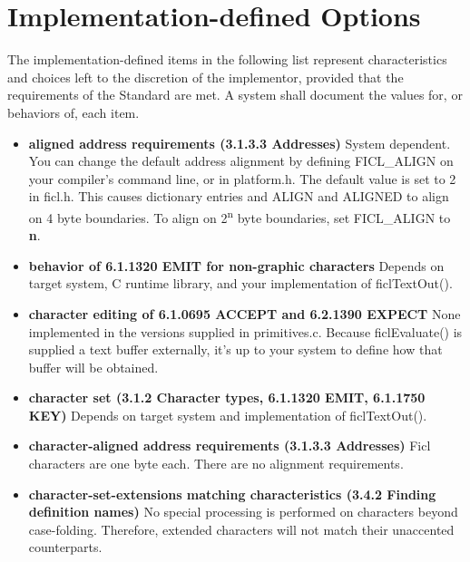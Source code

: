 \section{Implementation-defined Options}
The implementation-defined items in the following list represent
characteristics and choices left to the discretion of the implementor,
provided that the requirements of the Standard are met. A system shall
document the values for, or behaviors of, each item.
\begin{itemize}[noitemsep]
	\item \textbf{aligned address requirements (3.1.3.3
		Addresses)}\newline
	System dependent. You can change the default address alignment
	by defining FICL\_ALIGN on your compiler's command line, or in
	platform.h. The default value is set to 2 in ficl.h. This causes
	dictionary entries and ALIGN and ALIGNED to align on 4 byte
	boundaries. To align on 2\textsuperscript{n} byte boundaries,
	set FICL\_ALIGN to \textbf{n}.

	\item \textbf{behavior of 6.1.1320 EMIT for non-graphic
		characters}\newline
	Depends on target system, C runtime library, and your
	implementation of ficlTextOut().

	\item \textbf{character editing of 6.1.0695 ACCEPT and 6.2.1390
		EXPECT}\newline
	None implemented in the versions supplied in primitives.c.
	Because ficlEvaluate() is supplied a text buffer externally,
	it's up to your system to define how that buffer will be obtained.

	\item \textbf{character set (3.1.2 Character types, 6.1.1320
		EMIT, 6.1.1750 KEY)}\newline
	Depends on target system and implementation of ficlTextOut().

	\item \textbf{character-aligned address requirements (3.1.3.3
		Addresses)}\newline
	Ficl characters are one byte each. There are no alignment
	requirements.

	\item \textbf{character-set-extensions matching characteristics
		(3.4.2 Finding definition names)}\newline
	No special processing is performed on characters beyond
	case-folding. Therefore, extended characters will not match
	their unaccented counterparts.


\end{itemize}
